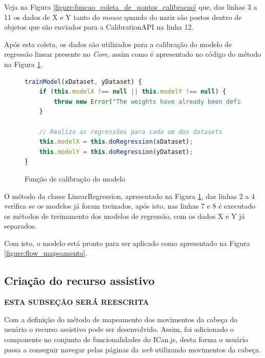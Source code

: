 \par Veja na Figura \ref{figure:funcao_coleta_de_pontos_calibracao} que, das linhas 3 a 11 os dados de X e Y tanto do \textit{mouse} quando do nariz são postos dentro de objetos que são enviados para a CalibrationAPI na linha 12.

\par Após esta coleta, os dados são utilizados para a calibração do modelo de regressão linear presente no \textit{Core}, assim como é apresentado no código do método na Figura \ref{figure:funcao_calibracao_modelo_de_regressao}.

\begin{figure}[H]
    \centering
    \begin{lstlisting}[language=JavaScript]
trainModel(xDataset, yDataset) {
    if (this.modelX !== null || this.modelY !== null) {
        throw new Error("The weights have already been defined, it is not possible to train the model")
    }

    // Realiza as regressões para cada um dos datasets
    this.modelX = this.doRegression(xDataset);
    this.modelY = this.doRegression(yDataset);
}
    \end{lstlisting}
    \caption{Função de calibração do modelo}
    \label{figure:funcao_calibracao_modelo_de_regressao}
\end{figure}

\par O método da classe LinearRegression, apresentado na Figura \ref{figure:funcao_calibracao_modelo_de_regressao}, das linhas 2 a 4 verifica se os modelos já foram treinados, após isto, nas linhas 7 e 8 é executado os métodos de treinamento dos modelos de regressão, com os dados X e Y já separados.

\par Com isto, o modelo está pronto para ser aplicado como apresentado na Figura \ref{figure:flow_mapeamento}.

\subsection{Criação do recurso assistivo}

\textbf{ESTA SUBSEÇÃO SERÁ REESCRITA}

\par Com a definição do método de mapeamento dos movimentos da cabeça do usuário o recurso assistivo pode ser desenvolvido. Assim, foi adicionado o componente  no conjunto de funcionalidades  do ICan.js, desta forma o usuário passa a conseguir navegar pelas páginas da \textit{web} utilizando movimentos da cabeça.

